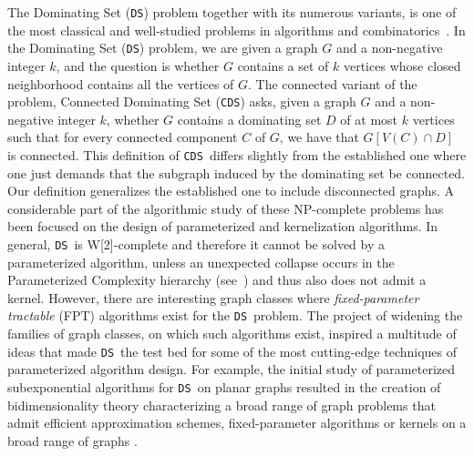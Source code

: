 \documentclass[11pt]{article}
\newcommand{\tDS}{{\texttt{\sc DS}}}
\newcommand{\tCDS}{{\texttt{\sc CDS}}}
\begin{document}
 
The {\sc Dominating Set} (\tDS) problem
 together with its numerous variants, is one of the most  classical and well-studied problems in algorithms and combinatorics~\cite{HaynesHS98}. 
In the {\sc Dominating Set} (\tDS) problem,
we are given a graph $G$ and a non-negative integer $k$, and the question is 
whether $G$ contains a set of $k$ vertices whose closed neighborhood contains all the vertices of $G$.  
The connected variant of the problem,  {\sc Connected Dominating Set} (\tCDS) asks, given a graph $G$ and a non-negative 
integer $k$, whether $G$ contains a dominating set $D$ of at most $k$ vertices such that 
for every connected component $C$ of $G$, we have that $G[V(C)\cap D]$ is connected.  
This definition of \tCDS\ differs slightly from the established one where one just  demands that  
the subgraph induced by the dominating set  be connected. Our definition generalizes the established 
one  to  include disconnected graphs. 
A  considerable part of the algorithmic  study of these {\sf NP}-complete  problems has been focused on the  design of parameterized and kernelization algorithms. In general,  \tDS \,  is {\sf W}[2]-complete 
and therefore it cannot be solved by a parameterized algorithm, 
unless an unexpected collapse occurs in the 
Parameterized Complexity hierarchy (see~\cite{DowneyF98,FlumGrohebook,Niedermeierbook06}) and thus also does not admit a kernel.  
However, there are  interesting graph classes where  {\em fixed-parameter tractable} {\sf  (FPT)}  algorithms exist
for the \tDS \, problem. The project of  widening the families of graph classes, on which such algorithms exist, inspired a multitude of  ideas that made \tDS \,  the test bed for some of the most cutting-edge techniques of parameterized algorithm design. For example, the initial study of parameterized subexponential algorithms for \tDS \, on planar graphs \cite{AlberBFKN02,DemaineFHT05talg,FominT06} resulted in the creation of bidimensionality theory
characterizing a broad range of graph problems  that admit efficient approximation schemes, fixed-parameter algorithms or kernels on a broad range of graphs \cite{DemaineFHT05sub,DemaineH07-CJ,DornFLRS10,FominLRS10,F.V.Fomin:2010oq,FominLS12}. 
 
\end{document}
